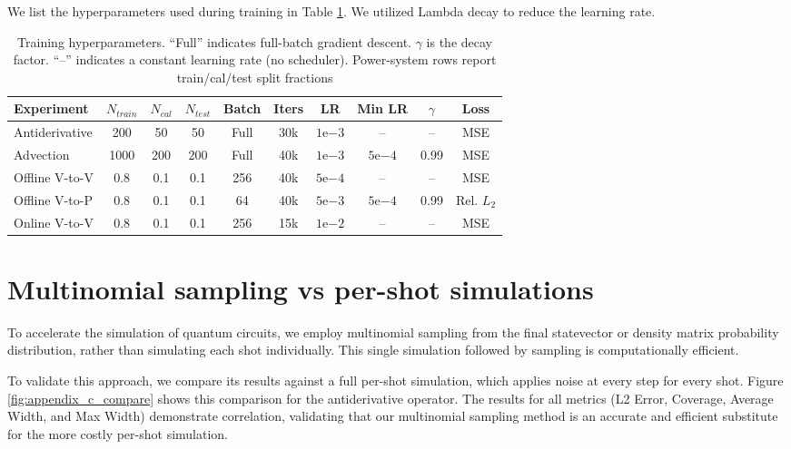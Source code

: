 \documentclass{iopjournal}
\begin{document}
We list the hyperparameters used during training in Table \ref{tab:training_hyperparams}. We utilized Lambda decay to reduce the learning rate.

\begin{table}[t]

\caption{Training hyperparameters. ``Full'' indicates full-batch gradient descent. $\gamma$ is the decay factor. ``--'' indicates a constant learning rate (no scheduler). Power-system rows report train/cal/test split fractions}
\label{tab:training_hyperparams}

\begin{center}
\small
\begin{tabular}{lccccccccc}
\hline
\textbf{Experiment} & $N_{train}$ & $N_{cal}$ & $N_{test}$ & \textbf{Batch} & \textbf{Iters} & \textbf{LR} & \textbf{Min LR} & $\gamma$ & \textbf{Loss} \\
\hline

Antiderivative & 200  & 50  & 50  & Full & 30k & $1\mathrm{e}{-3}$ & --              & --   & MSE \\
Advection      & 1000 & 200 & 200 & Full & 40k & $1\mathrm{e}{-3}$ & $5\mathrm{e}{-4}$ & 0.99 & MSE \\
Offline V-to-V & 0.8  & 0.1 & 0.1 & 256  & 40k & $5\mathrm{e}{-4}$ & --              & --   & MSE \\
Offline V-to-P & 0.8  & 0.1 & 0.1 & 64   & 40k & $5\mathrm{e}{-3}$ & $5\mathrm{e}{-4}$ & 0.99 & Rel. $L_2$ \\
Online V-to-V  & 0.8  & 0.1 & 0.1 & 256  & 15k & $1\mathrm{e}{-2}$ & --              & --   & MSE \\

\hline
\end{tabular}
\end{center}

\end{table}

\section{Multinomial sampling vs per-shot simulations}
\label{sec:multinomial}


To accelerate the simulation of quantum circuits, we employ multinomial sampling from the final statevector or density matrix probability distribution, rather than simulating each shot individually. This single simulation followed by sampling is computationally efficient.

To validate this approach, we compare its results against a full per-shot simulation, which applies noise at every step for every shot. Figure \ref{fig:appendix_c_compare} shows this comparison for the antiderivative operator. The results for all metrics (L2 Error, Coverage, Average Width, and Max Width) demonstrate correlation, validating that our multinomial sampling method is an accurate and efficient substitute for the more costly per-shot simulation.
\end{document}
